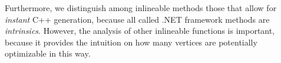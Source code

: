 Furthermore, we distinguish among inlineable methods those that allow for \emph{instant} C++ generation, because all called .NET framework methods are \emph{intrinsics}. However, the analysis of other inlineable functions is important, because it provides the intuition on how many vertices are potentially optimizable in this way.

